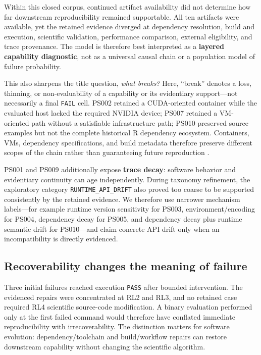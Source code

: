 \documentclass[a4paper,fleqn]{cas-dc}
\begin{document}
Within this closed corpus, continued artifact availability did not determine how far downstream reproducibility remained supportable. All ten artifacts were available, yet the retained evidence diverged at dependency resolution, build and execution, scientific validation, performance comparison, external eligibility, and trace provenance. The model is therefore best interpreted as a \textbf{layered capability diagnostic}, not as a universal causal chain or a population model of failure probability.

This also sharpens the title question, \emph{what breaks?} Here, ``break'' denotes a loss, thinning, or non-evaluability of a capability or its evidentiary support---not necessarily a final \texttt{FAIL} cell. PS002 retained a CUDA-oriented container while the evaluated host lacked the required NVIDIA device; PS007 retained a VM-oriented path without a satisfiable infrastructure path; PS010 preserved source examples but not the complete historical R dependency ecosystem. Containers, VMs, dependency specifications, and build metadata therefore preserve different scopes of the chain rather than guaranteeing future reproduction \citep{boettiger2015docker,chan2023rang,guilloteau2024longevity}.

PS001 and PS009 additionally expose \textbf{trace decay}: software behavior and evidentiary continuity can age independently. During taxonomy refinement, the exploratory category \texttt{RUNTIME\_API\_DRIFT} also proved too coarse to be supported consistently by the retained evidence. We therefore use narrower mechanism labels---for example runtime version sensitivity for PS003, environment/encoding for PS004, dependency decay for PS005, and dependency decay plus runtime semantic drift for PS010---and claim concrete API drift only when an incompatibility is directly evidenced.

\subsection{Recoverability changes the meaning of failure}

Three initial failures reached execution \texttt{PASS} after bounded intervention. The evidenced repairs were concentrated at RL2 and RL3, and no retained case required RL4 scientific source-code modification. A binary evaluation performed only at the first failed command would therefore have conflated immediate reproducibility with irrecoverability. The distinction matters for software evolution: dependency/toolchain and build/workflow repairs can restore downstream capability without changing the scientific algorithm.
\end{document}
